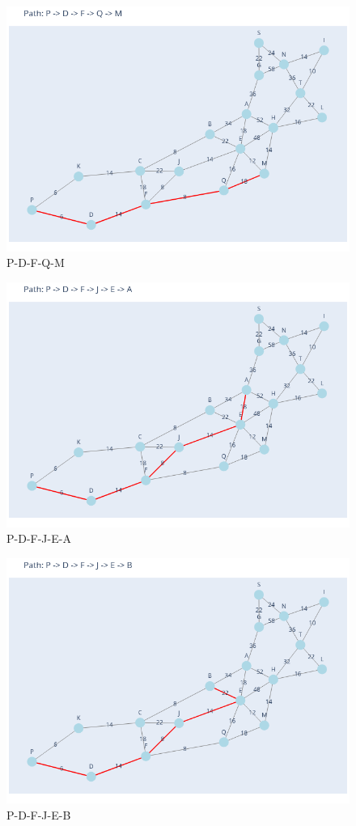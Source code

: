 \documentclass[11pt]{book}
\renewcommand{\=}[1]{\stackrel{#1}{=}} %
\theoremstyle{definition}
\theoremstyle{remark}
\begin{document}
\begin{figure}
    \centering
    \includegraphics[width=0.7\linewidth]{Plots/P_D_F_Q_M.png}
    \caption{P-D-F-Q-M}
    \label{fig:enter-label}
\end{figure}
\begin{figure}
    \centering
    \includegraphics[width=0.7\linewidth]{Plots/P_D_F_J_E_A.png}
    \caption{P-D-F-J-E-A}
    \label{fig:enter-label}
\end{figure}
\begin{figure}
    \centering
    \includegraphics[width=0.7\linewidth]{Plots/P_D_F_J_E_B.png}
    \caption{P-D-F-J-E-B}
    \label{fig:enter-label}
\end{figure}
\end{document}
